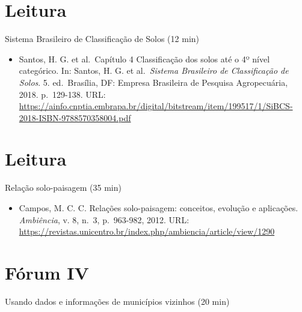 \documentclass[
  11pt,
  a4paper,
  dvipsnames]{tufte-book}
\providecommand{\tightlist}{%
  \setlength{\itemsep}{0pt}\setlength{\parskip}{0pt}}
\begin{document}
\hypertarget{leitura-9}{%
\section{Leitura}\label{leitura-9}}

Sistema Brasileiro de Classificação de Solos (12 min)

\begin{itemize}
\tightlist
\item
  Santos, H. G. et al.~Capítulo 4 Classificação dos solos até o 4º nível categórico. In: Santos, H. G. et al.~\emph{Sistema Brasileiro de Classificação de Solos}. 5. ed.~Brasília, DF: Empresa Brasileira de Pesquisa Agropecuária, 2018. p.~129-138. URL: \url{https://ainfo.cnptia.embrapa.br/digital/bitstream/item/199517/1/SiBCS-2018-ISBN-9788570358004.pdf}
\end{itemize}

\hypertarget{leitura-10}{%
\section{Leitura}\label{leitura-10}}

Relação solo-paisagem (35 min)

\begin{itemize}
\tightlist
\item
  Campos, M. C. C. Relações solo-paisagem: conceitos, evolução e aplicações. \emph{Ambiência}, v. 8, n.~3, p.~963-982, 2012. URL: \url{https://revistas.unicentro.br/index.php/ambiencia/article/view/1290}
\end{itemize}

\hypertarget{fuxf3rum-iv}{%
\section{Fórum IV}\label{fuxf3rum-iv}}

Usando dados e informações de municípios vizinhos (20 min)
\end{document}
